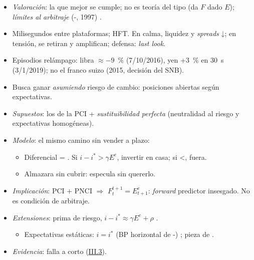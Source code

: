 \documentclass{article}
\begin{document}
\begin{columnas}
\begin{itemize}
\begin{itemize}
  \end{itemize}
\item \emph{Valoración}: la que mejor se cumple; no es teoría del tipo (da $F$ dado $E$); \emph{límites al arbitraje} (-, 1997) .
\end{itemize}
\begin{itemize}
\item Milisegundos entre plataformas; HFT. En calma, liquidez y \emph{spreads} ↓; en tensión, se retiran y amplifican; defensa: \emph{last look}.
\item Episodios relámpago: libra $\approx-9$~\% (7/10/2016), yen +3~\% en 30~s (3/1/2019); no el franco suizo (2015, decisión del SNB).
\end{itemize}
\begin{itemize}
\item Busca ganar \emph{asumiendo} riesgo de cambio: posiciones abiertas según expectativas.
\end{itemize}
\begin{itemize}
\item \emph{Supuestos}: los de la PCI + \emph{sustituibilidad perfecta} (neutralidad al riesgo y expectativas homogéneas).
\item \emph{Modelo}: el mismo camino sin vender a plazo:
  \begin{itemize}
  \item Diferencial = . Si $i-i^{*}>\gamma E^e$, invertir en casa; si <, fuera.
  \item Almazara sin cubrir: especula sin quererlo.
  \end{itemize}
\item \emph{Implicación}: PCI + PNCI $\Rightarrow$ $F_t^{t+1}=E^e_{t+1}$: \emph{forward} predictor insesgado. No es condición de arbitraje.
\item \emph{Extensiones}: prima de riesgo, $i-i^{*}\approx\gamma E^e+\rho$  .
  \begin{itemize}
  \item Expectativas estáticas: $i=i^{*}$ (BP horizontal de -) ; pieza de  .
  \end{itemize}
\item \emph{Evidencia}: falla a corto (\hyperref[rep:III.3]{III.3}).

\end{itemize}
\end{columnas}
\end{document}
